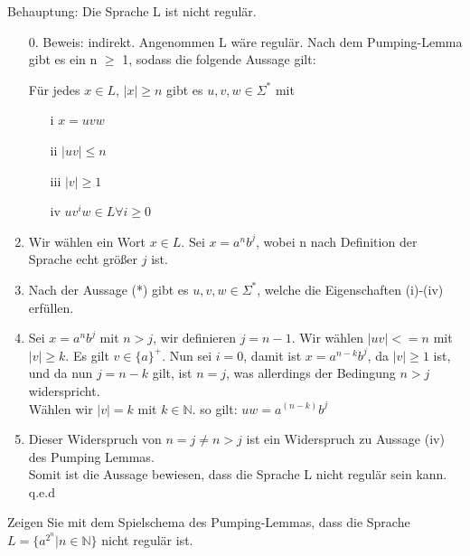 \documentclass[10pt, a4paper]{exam}
\begin{document}
\begin{questions}
    \begin{solution}
        Behauptung: Die Sprache L ist nicht regulär.
        \begin{enumerate}
            \item[0.] Beweis: indirekt. Angenommen L wäre regulär. Nach dem Pumping-Lemma gibt es ein n $\geq$ 1, sodass die folgende Aussage gilt:
                  \begin{center}
                      Für jedes $x \in L$,  $\mid x \mid \geq n$ gibt es $u,v,w \in\Sigma^*$ mit
                      \begin{itemize}
                          \item[i] $x = uvw$
                          \item[ii] $\mid uv \mid\leq n$
                          \item[iii] $\mid v \mid\geq 1$
                          \item[iv] $uv^iw \in L \forall i \geq 0$
                      \end{itemize}
                  \end{center}
            \item Wir wählen ein Wort $x\in L$. Sei $x = a^nb^j$, wobei n nach Definition der Sprache echt größer $j$ ist.
            \item Nach der Aussage (*) gibt es $u,v,w \in\Sigma^*$, welche die Eigenschaften (i)-(iv) erfüllen.
            \item Sei $x=a^nb^j$ mit $n > j$, wir definieren $j=n-1$.
                  Wir wählen $\mid uv \mid < = n$ mit $\mid v\mid\geq k$. Es gilt $v\in\{a\}^+$. Nun sei $i = 0$, damit ist $x=a^{n-k}b^j$, da $\mid v\mid\geq 1$ ist, und da nun $j=n-k$ gilt, ist $n=j$, was allerdings der Bedingung $n>j$ widerspricht. \\
                  Wählen wir $\mid v\mid = k$ mit $k\in\mathbb{N}$. so gilt: $uw =a^{(n-k)}b^j$
            \item Dieser Widerspruch von $n = j \neq n > j$ ist ein Widerspruch zu Aussage (iv) des Pumping Lemmas.\\
                  Somit ist die Aussage bewiesen, dass die Sprache L nicht regulär sein kann. q.e.d
        \end{enumerate}
    \end{solution}

    \question Zeigen Sie mit dem Spielschema des Pumping-Lemmas, dass die Sprache $L=\{a^{2^n} | n\in\mathbb{N}\}$ nicht regulär ist.


\end{questions}
\end{document}
